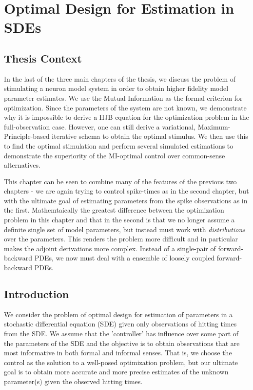 \chapter{Optimal Design for Estimation in SDEs}
\label{ch:optimal_design}
\graphicspath{{../OptEstimate/}}


 
\section{Thesis Context}
 In the last of the three main chapters of the thesis, we discuss the problem of
 stimulating a neuron model system in order to obtain higher fidelity model
 parameter estimates. We use the Mutual Information as the formal criterion for optimization. Since the
 parameters of the system are not known, we demonstrate why it is impossible to derive a HJB equation for the
 optimization problem in the full-observation case. However, one can still
 derive a variational, Maximum-Principle-based iterative schema to obtain the
 optimal stimulus. We then use this to find the optimal stimulation and perform
 several simulated estimations to demonstrate the superiority of the
 MI-optimal control over common-sense alternatives.
 
 This chapter can be seen to combine many of the features of the previous two
 chapters - we are again trying to control spike-times as in the second chapter,
 but with the ultimate goal of estimating parameters from the spike observations
 as in the first. Mathemtaically the greatest difference between the
 optimization problem in this chapter and that in the second is that we no
 longer assume a definite single set of model parameters, but instead must work
 with {\sl distributions} over the parameters. This renders the problem more
 difficult and in particular makes the adjoint derivations more complex. Instead
 of a single-pair of forward-backward PDEs, we now must deal with a ensemble of
 loosely coupled forward-backward PDEs.
  
    
\section{Introduction}
We consider the problem of optimal design for estimation of parameters in a
stochastic differential equation (SDE) given only observations of hitting times
from the SDE. We assume that the 'controller' has influence over some part of
the parameters of the SDE and the objective is to obtain observations that are
most informative in both formal and informal senses. That is, we choose the
control as the solution to a well-posed optimization problem, but our ultimate
goal is to obtain more accurate and more precise estimates of the unknown
parameter(s) given the observed hitting times.

